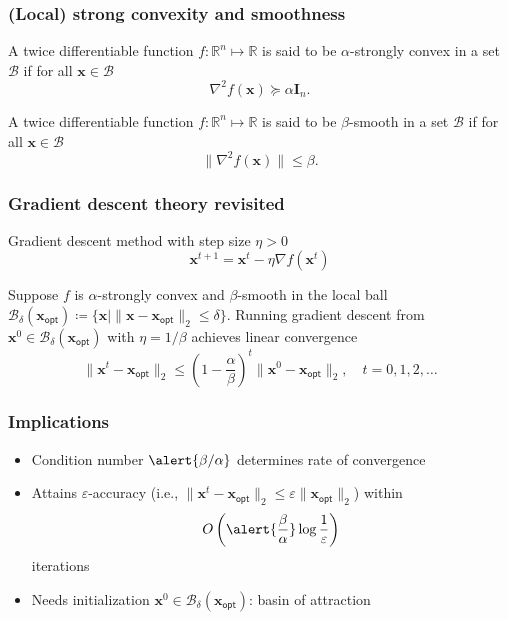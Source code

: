\documentclass[compress,
mathserif,wide,%
]{beamer}
\begin{document}
\begin{frame}
	\frametitle{(Local) strong convexity and smoothness}
	\begin{definition}
		A twice differentiable function $f : \mathbb{R}^{n} \mapsto \mathbb{R}$ is said to be $\alpha$-strongly convex in a set $\mathcal{B}$ if for all $\bm{x} \in \mathcal{B}$
		\[
		\nabla^2 f(\bm{x}) \succeq \alpha \bm{I}_{n}.
		\]
	\end{definition}
	
	\vfill
	\begin{definition}
		A twice differentiable function $f : \mathbb{R}^{n} \mapsto \mathbb{R}$ is said to be $\beta$-smooth in a set $\mathcal{B}$ if for all $\bm{x} \in \mathcal{B}$
		\[
		\| \nabla^2 f(\bm{x}) \| \leq \beta.
		\]
	\end{definition}
\end{frame}


\begin{frame}
	\frametitle{Gradient descent theory revisited}
	Gradient descent method with step size $\eta > 0$
	\[
		\bm{x}^{t+1}=\bm{x}^t - \eta \nabla f(\bm{x}^t) 
	\]
	
	\begin{lemma}\label{lemma:GD}
		Suppose $f$ is $\alpha$-strongly convex and $\beta$-smooth in the local ball $\mathcal{B}_{\delta}(\bm{x}_{\mathsf{opt}}) \coloneqq \{\bm{x} \mid \|\bm{x} - \bm{x}_{\mathsf{opt}}\|_2 \leq \delta \}$. Running gradient descent from $\bm{x}^{0} \in \mathcal{B}_{\delta}(\bm{x}_{\mathsf{opt}})$ with $\eta = 1 / \beta$ achieves linear convergence
		\[
		\|\bm{x}^{t} -\bm{x}_{\mathsf{opt}}\|_2 \leq \left(1- {\frac{\alpha}{\beta}}  
\right)^{t}\|\bm{x}^{0} -\bm{x}_{\mathsf{opt}}\|_2, \quad t = 0, 1, 2, \ldots
		\]
	\end{lemma}	
	

\end{frame}

\begin{frame}
	\frametitle{Implications}
		\begin{itemize}
	\itemsep0.5em
	\item Condition number $\alert{\beta / \alpha}$ determines rate of convergence
	\item Attains $\varepsilon$-accuracy (i.e., $\|\bm{x}^{t} -\bm{x}_{\mathsf{opt}}\|_2 \leq \varepsilon \|\bm{x}_{\mathsf{opt}}\|_2$) within 
	\[
	O\left( \alert{ \frac{\beta}{\alpha} } \log\frac{1}{\varepsilon} \right)
	\]
	 iterations
	 \item Needs initialization $\bm{x}^{0} \in \mathcal{B}_{\delta}(\bm{x}_{\mathsf{opt}})$: basin of attraction
\end{itemize}
\end{frame}
\end{document}
